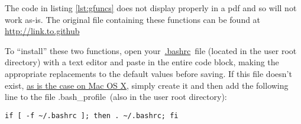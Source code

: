 \documentclass[a4paper]{article}
\begin{document}
The code in listing \ref{lst:gfuncs} does not display properly in a pdf and so will not work as-is. The original file containing these functions can be found at \url{http://link.to.github}

To ``install'' these two functions, open your~\href{http://superuser.com/questions/49289/what-is-the-bashrc-file}{.bashrc}~file (located in the user root directory) with a text editor and paste in the entire code block, making the appropriate replacements to the default values before saving.
If this file doesn't exist, \href{http://apple.stackexchange.com/a/119714}{as is the case on Mac OS X}, simply create it and then add the following line to the file .bash\_profile~(also in the user root directory): 

\begin{lstlisting}[caption={Source .bashrc}, label={lst:srcbashrc}]
if [ -f ~/.bashrc ]; then . ~/.bashrc; fi
\end{lstlisting}
\end{document}
